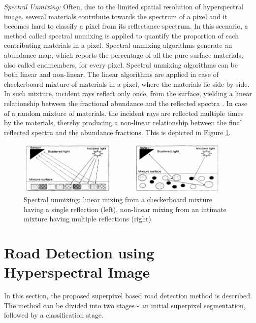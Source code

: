 \documentclass[12pt,twoside]{article}
\theoremstyle{plain}
\theoremstyle{definition}
\theoremstyle{remark}
\newcommand{\forceindent}{\leavevmode{\parindent=2em\indent}}
\begin{document}
\forceindent \textit{Spectral Unmixing:} Often, due to the limited spatial resolution of hyperspectral image, several materials contribute towards the spectrum of a pixel and it becomes hard to classify a pixel from its reflectance spectrum. In this scenario, a method called spectral unmixing is applied to quantify the proportion of each contributing materials in a pixel. Spectral unmixing algorithms generate an abundance map, which reports the percentage of all the pure surface materials, also called endmembers, for every pixel. Spectral unmixing algorithms can be both linear and non-linear. The linear algorithms are applied in case of  checkerboard mixture of materials in a pixel, where the materials lie side by side. In such mixture, incident rays reflect only once, from the surface, yielding a linear relationship between the fractional abundance and the reflected spectra \cite{keshava2000algorithm}. In case of a random mixture of materials, the incident rays are reflected multiple times by the materials, thereby producing a non-linear relationship between the final reflected spectra and the abundance fractions. This is depicted in Figure \ref{fig:unmix}.
\begin{figure}[hbtp]
\centering
\includegraphics[width=0.95\textwidth]{src/spectral_unmixing.png}
\caption{Spectral unmixing: linear mixing from a checkerboard mixture having a single reflection (left), non-linear mixing from an intimate mixture having multiple reflections (right) \cite{keshava2000algorithm}}
\label{fig:unmix}
\end{figure}

\section{Road Detection using Hyperspectral Image}
\label{sec:model}
In this section, the proposed superpixel based road detection method is described. The method can be divided into two stages - an initial superpixel segmentation, followed by a classification stage. 
\end{document}
